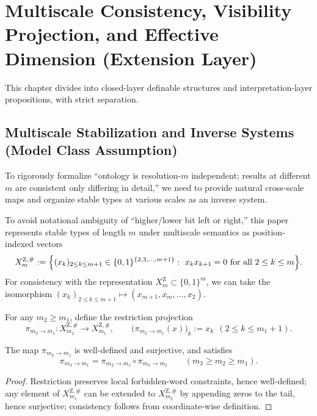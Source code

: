 \section{Multiscale Consistency, Visibility Projection, and Effective Dimension (Extension Layer)}

This chapter divides into closed-layer definable structures and interpretation-layer propositions, with strict separation.

\subsection{Multiscale Stabilization and Inverse Systems (Model Class Assumption)}

To rigorously formalize ``ontology is resolution-$m$ independent; results at different $m$ are consistent only differing in detail,'' we need to provide natural cross-scale maps and organize stable types at various scales as an inverse system.

\begin{definition}\label{def:XmZ-indexed-multiscale}
To avoid notational ambiguity of ``higher/lower bit left or right,'' this paper represents stable types of length $m$ under multiscale semantics as position-indexed vectors
\[
X_m^{\mathrm Z,\#}:=\Bigl\{(x_k)_{2\le k\le m+1}\in\{0,1\}^{\{2,3,\dots,m+1\}}:\ x_kx_{k+1}=0\ \text{for all}\ 2\le k\le m\Bigr\}.
\]
For consistency with the representation $X_m^{\mathrm Z}\subset\{0,1\}^m$, we can take the isomorphism $(x_k)_{2\le k\le m+1}\mapsto (x_{m+1},x_m,\dots,x_2)$.
\end{definition}

\begin{definition}\label{def:pi-m2-m1-multiscale}
For any $m_2\ge m_1$, define the restriction projection
\[
\pi_{m_2\to m_1}:X_{m_2}^{\mathrm Z,\#}\to X_{m_1}^{\mathrm Z,\#},\qquad
\bigl(\pi_{m_2\to m_1}(x)\bigr)_k:=x_k\ \ (2\le k\le m_1+1).
\]
\end{definition}

\begin{lemma}\label{lem:multiscale-pi-basic}
The map $\pi_{m_2\to m_1}$ is well-defined and surjective, and satisfies
\[
\pi_{m_3\to m_1}=\pi_{m_2\to m_1}\circ \pi_{m_3\to m_2}\qquad (m_3\ge m_2\ge m_1).
\]
\end{lemma}

\begin{proof}
Restriction preserves local forbidden-word constraints, hence well-defined; any element of $X_{m_1}^{\mathrm Z,\#}$ can be extended to $X_{m_2}^{\mathrm Z,\#}$ by appending zeros to the tail, hence surjective; consistency follows from coordinate-wise definition.
\end{proof}

